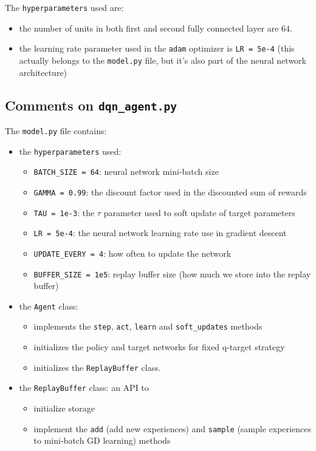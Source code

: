 \documentclass[
]{article}
\providecommand{\tightlist}{%
  \setlength{\itemsep}{0pt}\setlength{\parskip}{0pt}}
\begin{document}
The \texttt{hyperparameters} used are:

\begin{itemize}
\tightlist
\item
  the number of units in both first and second fully connected layer are
  64.
\item
  the learning rate parameter used in the \texttt{adam} optimizer is
  \texttt{LR\ =\ 5e-4} (this actually belongs to the \texttt{model.py}
  file, but it's also part of the neural network architecture)
\end{itemize}

\hypertarget{comments-on-dqn_agent.py}{%
\subsection{\texorpdfstring{Comments on
\texttt{dqn\_agent.py}}{Comments on dqn\_agent.py}}\label{comments-on-dqn_agent.py}}

The \texttt{model.py} file contains:

\begin{itemize}
\tightlist
\item
  the \texttt{hyperparameters} used:

  \begin{itemize}
  \tightlist
  \item
    \texttt{BATCH\_SIZE\ =\ 64}: neural network mini-batch size
  \item
    \texttt{GAMMA\ =\ 0.99}: the discount factor used in the discounted
    sum of rewards
  \item
    \texttt{TAU\ =\ 1e-3}: the \(\tau\) parameter used to soft update of
    target parameters
  \item
    \texttt{LR\ =\ 5e-4}: the neural network learning rate use in
    gradient descent
  \item
    \texttt{UPDATE\_EVERY\ =\ 4}: how often to update the network
  \item
    \texttt{BUFFER\_SIZE\ =\ 1e5}: replay buffer size (how much we store
    into the replay buffer)
  \end{itemize}
\item
  the \texttt{Agent} class:

  \begin{itemize}
  \tightlist
  \item
    implements the \texttt{step}, \texttt{act}, \texttt{learn} and
    \texttt{soft\_updates} methods
  \item
    initializes the policy and target networks for fixed q-target
    strategy
  \item
    initializes the \texttt{ReplayBuffer} class.
  \end{itemize}
\item
  the \texttt{ReplayBuffer} class: an API to

  \begin{itemize}
  \tightlist
  \item
    initialize storage
  \item
    implement the \texttt{add} (add new experiences) and \texttt{sample}
    (sample experiences to mini-batch GD learning) methods
  \end{itemize}
\end{itemize}
\end{document}
